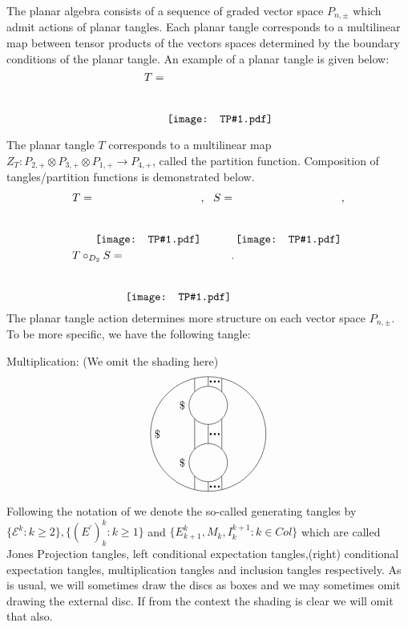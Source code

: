 \documentclass[11pt,letterpaper]{amsart}
\newcommand{\grc}[1]{\raisebox{-1.3cm}{\texttt{[image: TP\#1.pdf]}}}
\theoremstyle{definition}
\theoremstyle{remark}
\begin{document}
The planar algebra consists of a sequence of graded vector space ${P}_{n,\pm}$ which admit actions of planar tangles. Each planar tangle corresponds to a multilinear map between tensor products of the vectors spaces determined by the boundary conditions of the planar tangle. An example of a planar tangle is given below:
\begin{equation*}
T=\grc{Tangle1}
\end{equation*}

The planar tangle $T$ corresponds to a multilinear map $Z_T: {P}_{2,+}\otimes {P}_{3,+}\otimes {P}_{1,+}\rightarrow {P}_{4,+}$, called the partition function. Composition of tangles/partition functions is demonstrated below. 
\begin{align*}
&T=\grc{Tangle1},~~S=\grc{Tangle2},\\
&T\circ_{D_2}S=\grc{Tangle3}.
\end{align*}
The planar tangle action determines more structure on each vector space $P_{n,\pm}$. To be more specific, we have the following tangle:

Multiplication: (We omit the shading here)
\begin{equation*}
\begin{tikzpicture}
\draw (0,0) circle [radius=1.8];
\draw (0,.9) circle [radius=.6];
\draw (0,-.9) circle [radius=.6];
\draw (0,1.5)--(0,1.8);
\draw (0,.3)--(0,-.3);
\draw (.707*.6,.707*.6+.9)--(.707*.6,1.75);
\draw (-.707*.6,.707*.6+.9)--(-.707*.6,1.75);
\draw (.707*.6,-.707*.6+.9)--(.707*.6,.707*.6-.9);
\draw (-.707*.6,-.707*.6+.9)--(-.707*.6,.707*.6-.9);
\draw (0,-1.5)--(0,-1.8);
\draw (.707*.6,-.707*.6-.9)--(.707*.6,-1.75);
\draw (-.707*.6,-.707*.6-.9)--(-.707*.6,-1.75);
\node at (-.6,.9) [left] {\$};
\node at (-.6,-.9) [left] {\$};
\node at (-1.8,0) [right] {\$};
\draw (.05,0)--(.35,0) [ultra thick, dotted];
\draw (.05,1.65)--(.35,1.65) [ultra thick, dotted];
\draw (.05,-1.65)--(.35,-1.65) [ultra thick, dotted];
\end{tikzpicture}
\end{equation*}

Following the notation of \cite{KodSun} we denote the so-called generating tangles  by $\{{\mathcal{E}}^k:k\geq 2\}, \{{(E^{\prime})}^k_k: k\geq 1\}$ and $\{E^k_{k+1},M_k, I^{k+1}_k : k\in Col\}$ which are called 
Jones Projection tangles, left conditional expectation tangles,(right) conditional expectation tangles, multiplication tangles and inclusion tangles  respectively.
As is usual, we will sometimes draw the discs as boxes and we may sometimes omit drawing the external disc. If from the context the shading is clear we will omit that also.
\end{document}
